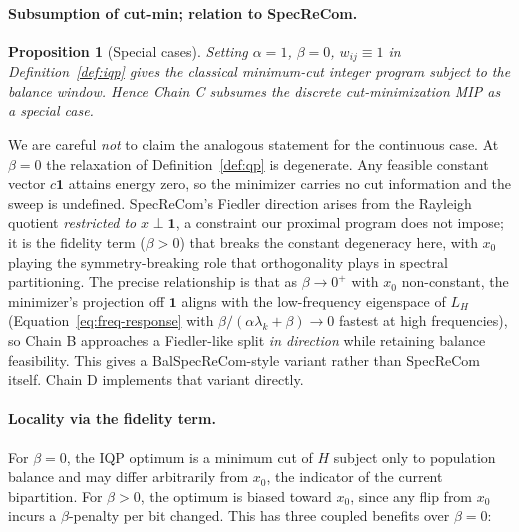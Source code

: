 \documentclass[11pt]{article}
\newtheorem{proposition}{Proposition}[section]
\begin{document}
\paragraph{Subsumption of cut-min; relation to SpecReCom.}\label{sec:iqp-subsumption}

\begin{proposition}[Special cases]\label{prop:iqp-special-cases}
Setting $\alpha = 1$, $\beta = 0$, $w_{ij} \equiv 1$ in
Definition~\ref{def:iqp} gives the classical minimum-cut integer
program subject to the balance window. Hence Chain C subsumes
the discrete cut-minimization MIP as a special case.
\end{proposition}

We are careful \emph{not} to claim the analogous statement for the
continuous case. At $\beta = 0$ the relaxation of
Definition~\ref{def:qp} is degenerate. Any feasible constant vector
$c\mathbf{1}$ attains energy zero, so the minimizer carries no cut
information and the sweep is undefined. SpecReCom's Fiedler direction
arises from the Rayleigh quotient \emph{restricted to}
$x \perp \mathbf{1}$, a constraint our proximal program does not
impose; it is the fidelity term ($\beta > 0$) that breaks the constant
degeneracy here, with $x_0$ playing the symmetry-breaking role that
orthogonality plays in spectral partitioning. The precise relationship
is that as $\beta \to 0^+$ with $x_0$ non-constant, the minimizer's
projection off $\mathbf{1}$ aligns with the low-frequency eigenspace
of $L_H$ (Equation~\eqref{eq:freq-response} with
$\beta/(\alpha\lambda_k + \beta) \to 0$ fastest at high frequencies),
so Chain B approaches a Fiedler-like split \emph{in direction} while
retaining balance feasibility. This gives a BalSpecReCom-style variant rather
than SpecReCom itself. Chain D implements that variant directly.

\paragraph{Locality via the fidelity term.}\label{sec:iqp-locality}

For $\beta = 0$, the IQP optimum is a minimum cut of $H$ subject only
to population balance and may differ arbitrarily from $x_0$, the indicator of the current bipartition. For
$\beta > 0$, the optimum is biased toward $x_0$, since any flip from $x_0$
incurs a $\beta$-penalty per bit changed. This has three coupled
benefits over $\beta = 0$:
\end{document}
